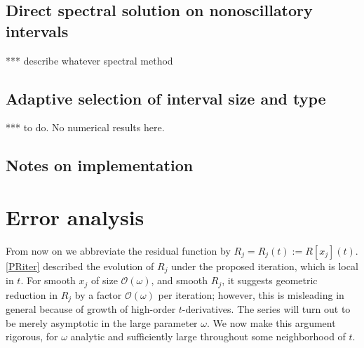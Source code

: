 \documentclass[10pt]{article}
\newcommand{\bigO}{{\mathcal O}}
\newcommand{\om}{\omega}
\begin{document}
\subsection{Direct spectral solution on nonoscillatory intervals}

*** describe whatever spectral method

\subsection{Adaptive selection of interval size and type}

*** to do. No numerical results here.

\subsection{Notes on implementation}


\section{Error analysis}

From now on we abbreviate the residual function by $R_j = R_j(t) := R[x_j](t)$.
\cref{PRiter} described the evolution of $R_j$
under the proposed iteration, which is local in $t$.
For smooth $x_j$ of size $\bigO(\om)$, and smooth $R_j$,
it suggests geometric reduction in $R_j$ by a factor $\bigO(\om)$ per iteration;
however, this is misleading in general because of
growth of high-order $t$-derivatives.
The series will turn out to be merely asymptotic in the large parameter $\om$.
We now make this argument rigorous, for $\om$ analytic
and sufficiently large throughout some neighborhood of $t$.

\end{document}
